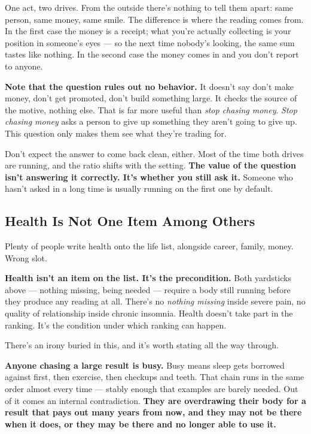 \documentclass[11pt,a4paper]{article}
\begin{document}
One act, two drives. From the outside there's nothing to tell them apart: same person, same money, same smile. The difference is where the reading comes from. In the first case the money is a receipt; what you're actually collecting is your position in someone's eyes --- so the next time nobody's looking, the same sum tastes like nothing. In the second case the money comes in and you don't report to anyone.

\textbf{Note that the question rules out no behavior.} It doesn't say don't make money, don't get promoted, don't build something large. It checks the source of the motive, nothing else. That is far more useful than \textit{stop chasing money}. \textit{Stop chasing money} asks a person to give up something they aren't going to give up. This question only makes them see what they're trading for.

Don't expect the answer to come back clean, either. Most of the time both drives are running, and the ratio shifts with the setting. \textbf{The value of the question isn't answering it correctly. It's whether you still ask it.} Someone who hasn't asked in a long time is usually running on the first one by default.

\subsection{Health Is Not One Item Among Others}

Plenty of people write health onto the life list, alongside career, family, money. Wrong slot.

\textbf{Health isn't an item on the list. It's the precondition.} Both yardsticks above --- nothing missing, being needed --- require a body still running before they produce any reading at all. There's no \textit{nothing missing} inside severe pain, no quality of relationship inside chronic insomnia. Health doesn't take part in the ranking. It's the condition under which ranking can happen.

There's an irony buried in this, and it's worth stating all the way through.

\textbf{Anyone chasing a large result is busy.} Busy means sleep gets borrowed against first, then exercise, then checkups and teeth. That chain runs in the same order almost every time --- stably enough that examples are barely needed. Out of it comes an internal contradiction. \textbf{They are overdrawing their body for a result that pays out many years from now, and they may not be there when it does, or they may be there and no longer able to use it.}
\end{document}
